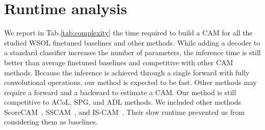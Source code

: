 \documentclass[twocolumn]{article}
\theoremstyle{definition}
\begin{document}
\section{Runtime analysis}
\label{sec:runtime}

We report in Tab.\ref{tab:complexity} the time required to build a CAM for all the studied WSOL finetuned baselines and other methods. While adding a decoder to a standard classifier increases the number of parameters, the inference time is still better than average finetuned baselines and competitive with other CAM methods. Because the inference is achieved through a single forward with fully convolutional operations, our method is expected to be fast. Other methods may require a forward and a backward to estimate a CAM. Our method is still competitive to ACoL, SPG, and ADL methods. We included other methods ScoreCAM~\cite{WangWDYZDMH20scorecam}, SSCAM~\cite{ZhangWKYH18}, and IS-CAM~\cite{naidu2020iscam}. Their slow runtime prevented us from considering them as baselines.


{
\setlength{\tabcolsep}{3pt}
\renewcommand{\arraystretch}{1.1}
\begin{table}[ht!]
\centering
{}
\caption{Architecture details. We use the same common backbones VGG16, InceptionV3, and Resnet50 without modification. Each backbone has its own definition of a layer and specific number of layers.}
\label{tab:arch-details}
\vspace{-1em}
\end{table}
}
\end{document}
